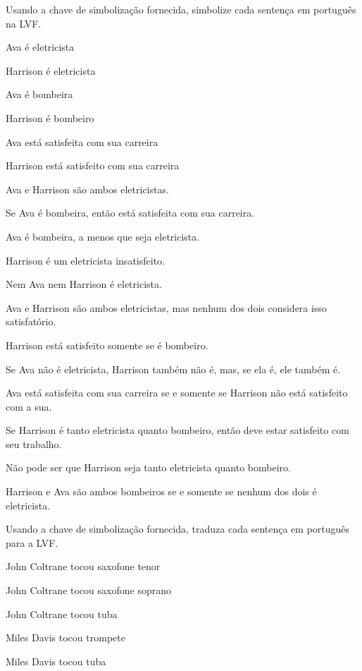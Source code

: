 \problempart Usando a chave de simbolização fornecida, simbolize cada sentença em português na LVF.\label{pr.avacareer}
	\begin{ekey}
		\item[\ensuremath{E_1}] Ava é eletricista
		\item[\ensuremath{E_2}] Harrison é eletricista
		\item[\ensuremath{F_1}] Ava é bombeira
		\item[\ensuremath{F_2}] Harrison é bombeiro
		\item[\ensuremath{S_1}] Ava está satisfeita com sua carreira
		\item[\ensuremath{S_2}] Harrison está satisfeito com sua carreira
	\end{ekey}
\begin{compactlist}
\item Ava e Harrison são ambos eletricistas.
\item Se Ava é bombeira, então está satisfeita com sua carreira.
\item Ava é bombeira, a menos que seja eletricista.
\item Harrison é um eletricista insatisfeito.
\item Nem Ava nem Harrison é eletricista.
\item Ava e Harrison são ambos eletricistas, mas nenhum dos dois considera isso satisfatório.
\item Harrison está satisfeito somente se é bombeiro.
\item Se Ava não é eletricista, Harrison também não é, mas, se ela é, ele também é.
\item Ava está satisfeita com sua carreira se e somente se Harrison não está satisfeito com a sua.
\item Se Harrison é tanto eletricista quanto bombeiro, então deve estar satisfeito com seu trabalho.
\item Não pode ser que Harrison seja tanto eletricista quanto bombeiro.
\item Harrison e Ava são ambos bombeiros se e somente se nenhum dos dois é eletricista.
\end{compactlist}

\problempart
Usando a chave de simbolização fornecida, traduza cada sentença em português para a LVF.
\label{pr.jazzinstruments}
\begin{ekey}
\item[\ensuremath{J_1}] John Coltrane tocou saxofone tenor
\item[\ensuremath{J_2}] John Coltrane tocou saxofone soprano
\item[\ensuremath{J_3}] John Coltrane tocou tuba
\item[\ensuremath{M_1}] Miles Davis tocou trompete
\item[\ensuremath{M_2}] Miles Davis tocou tuba
\end{ekey}

